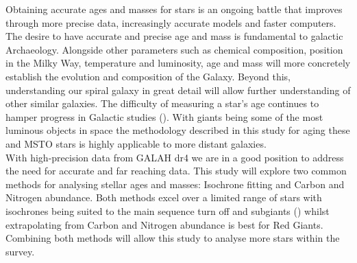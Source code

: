 \documentclass[fleqn,usenatbib]{mnras}
\begin{document}
Obtaining accurate ages and masses for stars is an ongoing battle that improves through more precise data, increasingly accurate models and faster computers. The desire to have accurate and precise age and mass is fundamental to galactic Archaeology. Alongside other parameters such as chemical composition, position in the Milky Way, temperature and luminosity, age and mass will more concretely establish the evolution and composition of the Galaxy. Beyond this, understanding our spiral galaxy in great detail will allow further understanding of other similar galaxies. The difficulty of measuring a star’s age continues to hamper progress in Galactic studies (\citet{BlandHawthorn_Gerhard2016}). With giants being some of the most luminous objects in space the methodology 
described in this study for aging these and MSTO stars is highly applicable to more distant galaxies. 
\\
With high-precision data from GALAH dr4 we are in a good position to address the need for accurate and far reaching data. This study will explore two common methods for analysing stellar ages and masses: Isochrone fitting and Carbon and Nitrogen abundance. Both methods excel over a limited range of stars with isochrones being suited to the main sequence turn off and subgiants (\citet{Martigetal2016}) whilst extrapolating from Carbon and Nitrogen abundance is best for Red Giants. Combining both methods will allow this study to analyse more stars within the survey.
\end{document}
